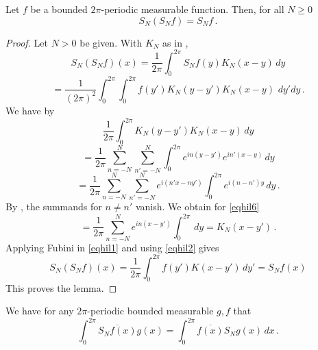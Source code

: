 \begin{lemma}
\label{partial-sum-projection}
  Let $f$ be a bounded $2\pi$-periodic measurable function. Then, for all $N\ge 0$
   \begin{equation}\label{projection}
   S_N(S_N f)=S_Nf\, .
   \end{equation}
   \end{lemma}
\begin{proof}
Let $N>0$ be given. With $K_N$ as in ,
\begin{equation*}
S_N (S_Nf) (x)=
\frac{1}{2\pi} \int_0^{2\pi} S_Nf(y)K_N(x-y)\, dy
\end{equation*}
\begin{equation}\label{eqhil1}
=
\frac{1}{(2\pi)^2}\int_0^{2\pi} \int_0^{2\pi} f(y')K_N(y-y') K_N(x-y)\, \, dy' dy\, .
\end{equation}
We have by 
\begin{equation*}
\frac{1}{2\pi}\int_0^{2\pi} K_N(y-y') K_N(x-y)\, dy
\end{equation*}
\begin{equation*}
=\frac{1}{2\pi}\sum_{n=-N}^N\sum_{n'=-N}^N
\int_0^{2\pi} e^{in(y-y')}e^{in'(x-y)}\, dy
\end{equation*}
\begin{equation}\label{eqhil6}
=\frac{1}{2\pi}\sum_{n=-N}^N\sum_{n'=-N}^N
e^{i(n'x-ny')}\int_0^{2\pi} e^{i(n-n')y}\, dy\, .
\end{equation}
By , the summands for $n\neq n'$ vanish.
We obtain for \eqref{eqhil6}
\begin{equation}\label{eqhil2}
=\frac{1}{2\pi}\sum_{n=-N}^N
e^{in(x-y')}\int_0^{2\pi} \, dy=K_N(x-y')\, .
\end{equation}
Applying Fubini in \eqref{eqhil1} and using
\eqref{eqhil2} gives
\begin{equation}
S_N(S_Nf)(x)=
\frac{1}{2\pi} \int_0^{2\pi} f(y')K(x-y') \, dy'=S_N f(x)
\end{equation}
This proves the lemma.
\end{proof}
\begin{lemma}
\label{partial-sum-selfadjoint}
    We have for any $2\pi$-periodic bounded measurable $g,f$ that
    \begin{equation}
       \int_0^{2\pi} \overline{S_Nf(x)} g(x)=\int_0^{2\pi} \overline{f(x)} S_Ng(x)\, dx\, .
    \end{equation}
\end{lemma}
